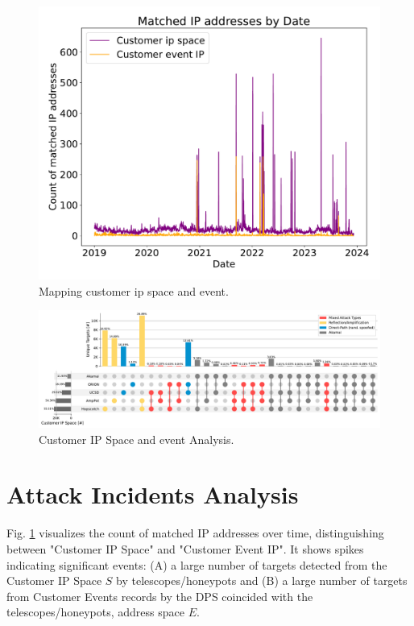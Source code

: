 \begin{figure}[htbp]
    \centering
    \includegraphics[scale=0.30]{graphs/matched_customer_graph.pdf}
    \caption{Mapping customer ip space and event.}
    \label{fig:mappedcustomergraph}
\end{figure}

\begin{figure}[htbp]
    \centering
    \includegraphics[scale=0.48]{graphs/noir3.pdf}
    \caption{Customer IP Space and event Analysis.}
    \label{fig:Mappedaddressanalysis}
\end{figure}

\section{Attack Incidents Analysis}\label{sec:attackeventsfromcustomeripspace}
Fig. \ref{fig:mappedcustomergraph} visualizes the count of matched IP addresses over time, distinguishing between "Customer IP Space" and "Customer Event IP". It shows spikes indicating significant events: (A) a large number of targets detected from the Customer IP Space $S$ by telescopes/honeypots and (B) a large number of targets from Customer Events records by the DPS coincided with the telescopes/honeypots, address space $E$.

